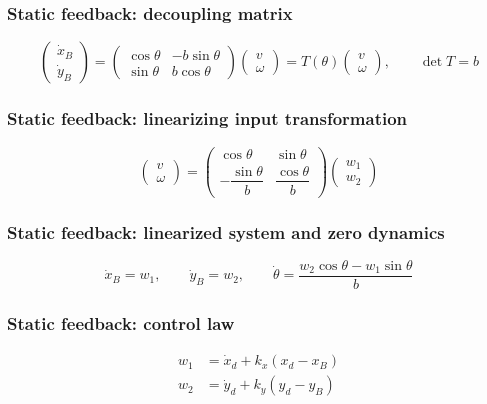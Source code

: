 \subsubsection{Static feedback: decoupling matrix}
\begin{equation*}
    \begin{pmatrix}\dot x_B\\\dot y_B\end{pmatrix}=\begin{pmatrix}\cos\theta&-b\sin\theta\\\sin\theta&b\cos\theta\end{pmatrix}\begin{pmatrix}v\\\omega\end{pmatrix}=T(\theta)\begin{pmatrix}v\\\omega\end{pmatrix},\qquad\det T=b
\end{equation*}

\subsubsection{Static feedback: linearizing input transformation}
\begin{equation*}
    \begin{pmatrix}v\\\omega\end{pmatrix}=\begin{pmatrix}\cos\theta&\sin\theta\\-\dfrac{\sin\theta}{b}&\dfrac{\cos\theta}{b}\end{pmatrix}\begin{pmatrix}w_1\\w_2\end{pmatrix}
\end{equation*}

\subsubsection{Static feedback: linearized system and zero dynamics}
\begin{equation*}
    \dot x_B=w_1,\qquad\dot y_B=w_2,\qquad\dot\theta=\frac{w_2\cos\theta-w_1\sin\theta}{b}
\end{equation*}

\subsubsection{Static feedback: control law}
\begin{align*}
    w_1&=\dot x_d+k_x(x_d-x_B)\\
    w_2&=\dot y_d+k_y(y_d-y_B)
\end{align*}


